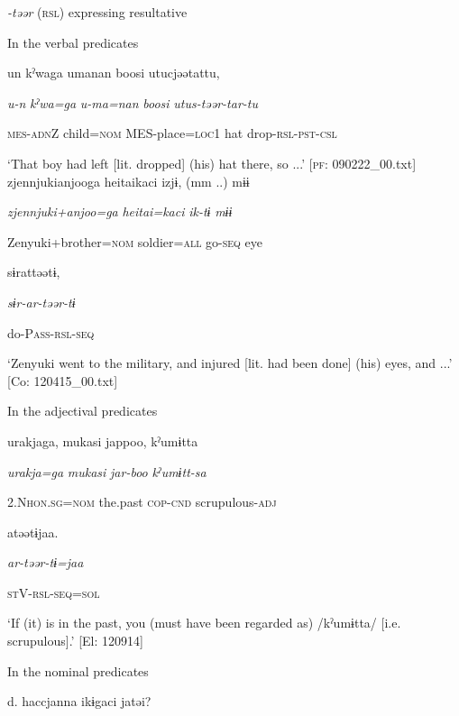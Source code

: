 \ea\label{ex:8-138}
  \textit{{}-təər} (\textsc{rsl}) expressing resultative

  In the verbal predicates

\ea [= (\ref{ex:6-132}a)]

    {\TM}
\glll  un  kˀwaga  umanan  {\textbar}boosi{\textbar}  utucjəətattu,

      \textit{u-n}  \textit{kˀwa=ga}  \textit{u-ma=nan}  \textit{boosi}  \textit{utus-təər{}-tar-tu}

      \textsc{mes}-\textsc{adn}Z  child=\textsc{nom}  MES-place=\textsc{loc}1  hat  drop-\textsc{rsl}-\textsc{pst}-\textsc{csl}

\glt ‘That boy had left [lit. dropped] (his) hat there, so ...’ [\textsc{pf}: 090222\_00.txt]
\ex {\TM}
\glll  zjennjukianjooga  {\textbar}heitai{\textbar}kaci  izjɨ,  (mm ..)  mɨɨ

      \textit{zjennjuki+anjoo=ga}  \textit{heitai=kaci}  \textit{ik-tɨ}    \textit{mɨɨ}

      Zenyuki+brother=\textsc{nom}  soldier=\textsc{all}  go-\textsc{seq}    eye

      sɨrattəətɨ,        

      \textit{sɨr-ar-təər{}-tɨ}       

      do-P\textsc{ass}-\textsc{rsl}-\textsc{seq}

\glt ‘Zenyuki went to the military, and injured [lit. had been done] (his) eyes, and ...’ [Co: 120415\_00.txt]
\z

  In the adjectival predicates


    {\TM}
\glll  urakjaga,  mukasi  jappoo,  kˀumɨtta

      \textit{urakja=ga}  \textit{mukasi}  \textit{jar-boo}  \textit{kˀumɨtt-sa}

      2.N\textsc{hon}.\textsc{sg}=\textsc{nom}  the.past  \textsc{cop}-\textsc{cnd}  scrupulous-\textsc{adj}

      atəətɨjaa.

      \textit{ar-təər-tɨ=jaa}

      \textsc{st}V-\textsc{rsl}-\textsc{seq}=\textsc{sol}

\glt ‘If (it) is in the past, you (must have been regarded as) /kˀumɨtta/ [i.e. scrupulous].’ [El: 120914]

  In the nominal predicates

  d. {\US}
\glll   haccjanna  ikɨgaci  jatəi?

